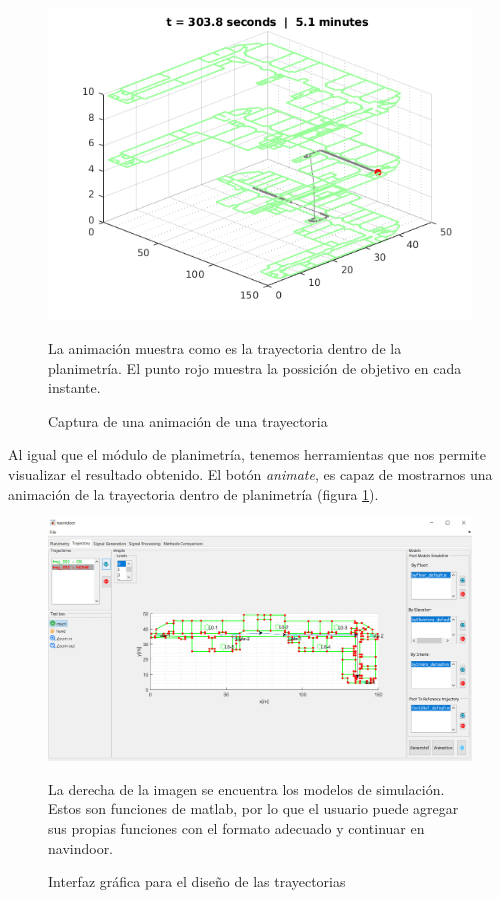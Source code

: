 \begin{figure}
    \centering
    \includegraphics[width=0.8\columnwidth]{img/Design/2animation.png}
    \caption[]{Captura de una animación de una trayectoria}
    \label{fig:animation}
    \footnotesize
    La animación muestra como es la trayectoria dentro de la planimetría. El punto rojo muestra la possición de objetivo en cada instante.
\end{figure}


Al igual que el módulo de planimetría, tenemos herramientas que nos permite visualizar el resultado obtenido. El botón \emph{animate}, es capaz de mostrarnos una animación de la trayectoria dentro de  planimetría (figura \ref{fig:animation}).

\begin{figure}[!ht]
    \centering
    \includegraphics[width=1.0\columnwidth]{img/Design/2.PNG}
    \caption[]{Interfaz gráfica para el diseño de las trayectorias}
    \label{fig:interfaz2}
    \footnotesize
    La derecha de la imagen se encuentra los modelos de simulación. Estos son funciones de matlab, por lo que el usuario puede agregar sus propias funciones con el formato adecuado y continuar en navindoor.
\end{figure}




